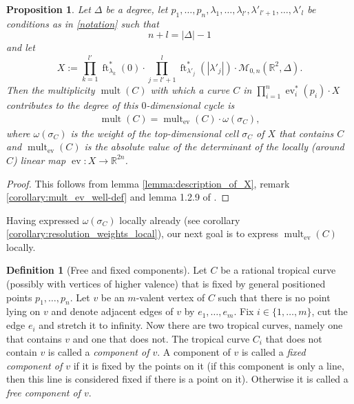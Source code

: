 \documentclass[11pt,reqno,a4]{amsart}
\theoremstyle{dotless}
\newtheorem{proposition}[corollary]{Proposition}
\theoremstyle{definition}
\newtheorem{definition}[corollary]{Definition}
\newcommand{\mult}{\operatorname{mult}}
\newcommand{\ft}{\operatorname{ft}}
\newcommand{\ev}{\operatorname{ev}}
\begin{document}
\begin{proposition}\label{prop:mult_X}
Let $\Delta$ be a degree, let $p_1,\dots,p_n,\lambda_1,\dots,\lambda_{l'},\lambda'_{l'+1},\dots,\lambda'_l$ be conditions as in \ref{notation} such that $$n+l=|\Delta|-1$$ and let $$X:=\prod_{k=1}^{l'}\ft_{\lambda_k}^*\left( 0\right)\cdot\prod_{j=l'+1}^{l}\ft_{\lambda'_j}^*\left( |\lambda'_j|\right)\cdot\mathcal{M}_{0,n}\left(\mathbb{R}^2,\Delta \right).$$ Then the multiplicity $\mult(C)$ with which a curve $C$ in $\prod_{i=1}^n\ev_i^*\left( p_i\right)\cdot X$ contributes to the degree of this $0$-dimensional cycle is 
\begin{align*}
\mult(C)=\mult_{\ev}(C)\cdot\omega(\sigma_C),
\end{align*}
where $\omega(\sigma_C)$ is the weight of the top-dimensional cell $\sigma_C$ of $X$ that contains $C$ and $\mult_{\ev}(C)$ is the absolute value of the determinant of the locally (around $C$) linear map $\ev:X\to\mathbb{R}^{2n}$.
\end{proposition}

\begin{proof}
This follows from lemma \ref{lemma:description_of_X}, remark \ref{corollary:mult_ev_well-def} and lemma 1.2.9 of \cite{Rau}.
\end{proof}




Having expressed $\omega(\sigma_C)$ locally already (see corollary \ref{corollary:resolution_weights_local}), our next goal is to express $\mult_{\ev}(C)$ locally.


\begin{definition}[Free and fixed components]\label{definition:fixed_free_components}
Let $C$ be a rational tropical curve (possibly with vertices of higher valence) that is fixed by general positioned points $p_1,\dots,p_n$. Let $v$ be an $m$-valent vertex of $C$ such that there is no point lying on $v$ and denote adjacent edges of $v$ by $e_1,\dots,e_m$. Fix $i\in\lbrace 1,\dots,m\rbrace$, cut the edge $e_i$ and stretch it to infinity. Now there are two tropical curves, namely one that contains $v$ and one that does not. The tropical curve $C_i$ that does not contain $v$ is called a \textit{component of $v$}. A component of $v$ is called a \textit{fixed component of $v$} if it is fixed by the points on it (if this component is only a line, then this line is considered fixed if there is a point on it). Otherwise it is called a \textit{free component of $v$}.
\end{definition}
\end{document}
